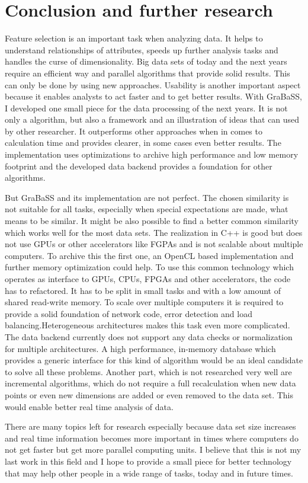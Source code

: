 \chapter{Conclusion and further research}
Feature selection is an important task when analyzing data. It helps to understand relationships of attributes, speeds up further analysis tasks and handles the curse of dimensionality. Big data sets of today and the next years require an efficient way and parallel algorithms that provide solid results. This can only be done by using new approaches. Usability is another important aspect because it enables analysts to act faster and to get better results. With GraBaSS, I developed one small piece for the data processing of the next years. It is not only a algorithm, but also a framework and an illustration of ideas that can used by other researcher. It outperforms other approaches when in comes to calculation time and provides clearer, in some cases even better results. The implementation uses optimizations to archive high performance and low memory footprint and the developed data backend provides a foundation for other algorithms.

But GraBaSS and its implementation are not perfect. The chosen similarity is not suitable for all tasks, especially when special expectations are made, what means to be similar. It might be also possible to find a better common similarity which works well for the most data sets. The realization in C++ is good but does not use GPUs or other accelerators like FGPAs and is not scalable about multiple computers. To archive this the first one, an OpenCL based implementation and further memory optimization could help. To use this common technology which operates as interface to GPUs, CPUs, FPGAs and other accelerators, the code has to refactored. It has to be split in small tasks and with a low amount of shared read-write memory. To scale over multiple computers it is required to provide a solid foundation of network code, error detection and load balancing.Heterogeneous architectures makes this task even more complicated. The data backend currently does not support any data checks or normalization for multiple architectures. A high performance, in-memory database which provides a generic interface for this kind of algorithm would be an ideal candidate to solve all these problems. Another part, which is not researched very well are incremental algorithms, which do not require a full recalculation when new data points or even new dimensions are added or even removed to the data set. This would enable better real time analysis of data.

There are many topics left for research especially because data set size increases and real time information becomes more important in times where computers do not get faster but get more parallel computing units. I believe that this is not my last work in this field and I hope to provide a small piece for better technology that may help other people in a wide range of tasks, today and in future times.

